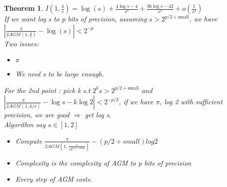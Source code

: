 \documentclass{article}
\newtheorem{theorem}{Theorem}
\theoremstyle{definition}
\theoremstyle{remark}
\begin{document}
\begin{theorem}
	$I(1,\frac{4}{s}) = \log(s) + \frac{4\log s - 4}{s^2} + \frac{36 \log s -42}{s^4} + o(\frac{1}{s^4})$\\
	If we want log s to p bits of precision, assuming $s > 2^{p/2 + \text{small}}$, we have $|\frac{\pi}{2AGM(1,\frac{4}{s})} - \log(s)| < 2^{-p}$\\
	
	Two issues:\begin{itemize}[label=$*$]
		\item $\pi$
		\item We need s to be large enough.
	\end{itemize}
	For the 2nd point : pick k s.t $2^k s > 2^{p/2+\text{small}}$ and $|\frac{\pi}{2AGM(1,4/s)} - \log s - k \log 2| < 2^{-p/2}$, if we have $\pi$, log 2 with sufficient precision, we are good $\Rightarrow$ get log s.\\
	
	Algorithm say $s \in [1,2]$
	\begin{itemize}[label=$*$]
		\item Compute $\frac{\pi}{2AGM(1,\frac{4}{s2^{p/2 + small}})} - (p/2 + small)log 2$
		\item Complexity is the complexity of AGM to p bits of precision
		\item Every step of AGM costs.
	\end{itemize}
\end{theorem}
\end{document}
